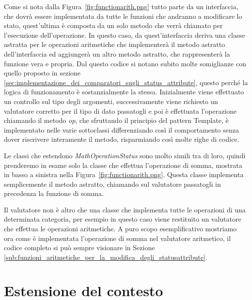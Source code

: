 Come si nota dalla Figura~\ref{fig:functionarith.png} tutto parte da un interfaccia, che dovrà essere implementata da tutte le funzioni che andranno a modificare lo stato, quest'ultima è composta da un solo metodo che verrà chiamato per l'esecuzione dell'operazione.
In questo caso, da quest'interfaccia deriva una classe astratta per le operazioni aritmetiche che implementerà il metodo astratto dell'interfaccia ed aggiungerà un altro metodo astratto, che rappresenterà la funzione vera e propria.
Dal questo codice si notano subito molte somiglianze con quello proposto in sezione \ref{sec:implementazione_dei_comparatori_sugli_status_attribute}, questo perché la logica di funzionamento è sostanzialmente la stessa.
Inizialmente viene effettuato un controllo sul tipo degli argomenti, successivamente viene richiesto un valutatore corretto per il tipo di dato passatogli e poi è effettuata l'operazione chiamando il metodo \textit{op}, che sfruttando il principio del pattern Template, è implementato nelle varie sottoclassi differenziando così il comportamento senza dover riscrivere interamente il metodo, risparmiando così molte righe di codice.\\ \par
Le classi che estendono \textit{MathOperationStatus} sono molto simili tra di loro, quindi prenderemo in esame solo la classe che effettua l'operazione di somma, mostrata in basso a sinistra nella Figura~\ref{fig:functionarith.png}.
Questa classe implementa semplicemente il metodo astratto, chiamando sul valutatore passatogli in precedenza la funzione di somma.\\ \par
Il valutatore non è altro che una classe che implementa tutte le operazioni di una determinata categoria, per esempio in questo caso viene restituito un valutatore che effettua le operazioni aritmetiche.
A puro scopo esemplificativo mostriamo ora come è implementata l'operazione di somma nel valutatore aritmetico, il codice completo si può sempre visionare in Sezione \ref{sub:funzioni_aritmetiche_per_la_modifica_degli_statusattribute}.

\section{Estensione del contesto} %
\label{sec:estensione_del_contesto}

